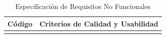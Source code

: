 \begin{table}[H]
\centering

\caption{Especificación de Requisitos No Funcionales}
\label{tab:requisitos_no_funcionales}

\begin{tabularx}{\textwidth}{|p{2.2cm}|X|}
\hline
\rowcolor{azulPastelApagado}
\textbf{Código} & \textbf{Criterios de Calidad y Usabilidad} \\ \hline
\rowcolor{azulclaro}

\end{tabularx}
\end{table}

